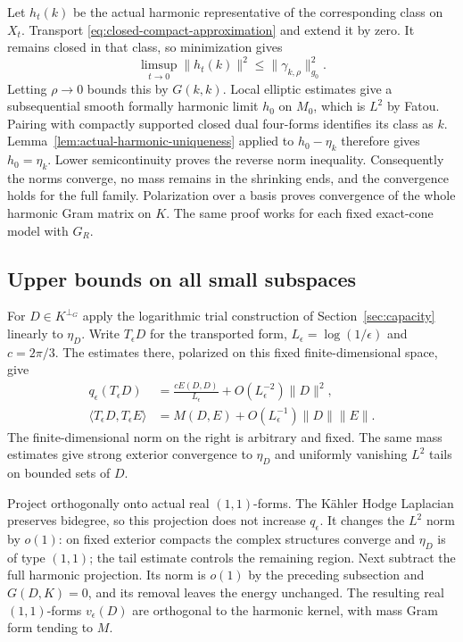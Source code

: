 Let $h_t(k)$ be the actual harmonic representative of the corresponding
class on $X_t$. Transport \eqref{eq:closed-compact-approximation} and
extend it by zero. It remains closed in that class, so minimization gives
\[
 \limsup_{t\to0}\|h_t(k)\|^2
 \le\|\gamma_{k,\rho}\|_{g_0}^2.
\]
Letting $\rho\to0$ bounds this by $G(k,k)$. Local elliptic estimates
give a subsequential smooth formally harmonic limit $h_0$ on $M_0$,
which is $L^2$ by Fatou. Pairing with compactly supported closed dual
four-forms identifies its class as $k$. Lemma~\ref{lem:actual-harmonic-uniqueness}
applied to $h_0-\eta_k$ therefore gives $h_0=\eta_k$.
Lower semicontinuity proves the reverse norm inequality.
Consequently the norms converge, no mass remains in the shrinking ends,
and the convergence holds for the full family. Polarization over a
basis proves convergence of the whole harmonic Gram matrix on $K$.
The same proof works for each fixed exact-cone model with $G_R$.

\subsection{Upper bounds on all small subspaces}
For $D\in K^{\perp_G}$ apply the logarithmic trial construction of
Section~\ref{sec:capacity} linearly to $\eta_D$. Write $T_\epsilon D$
for the transported form, $L_\epsilon=\log(1/\epsilon)$ and $c=2\pi/3$.
The estimates there, polarized on this fixed finite-dimensional space,
give
\begin{align}
 q_\epsilon(T_\epsilon D)
  &=\frac{cE(D,D)}{L_\epsilon}
          +O(L_\epsilon^{-2})\|D\|^2,\label{eq:matrix-trial-energy}\\
 \langle T_\epsilon D,T_\epsilon E\rangle
  &=M(D,E)+O(L_\epsilon^{-1})\|D\|\|E\|.\label{eq:matrix-trial-mass}
\end{align}
The finite-dimensional norm on the right is arbitrary and fixed.
The same mass estimates give strong exterior convergence to $\eta_D$
and uniformly vanishing $L^2$ tails on bounded sets of $D$.

Project orthogonally onto actual real $(1,1)$-forms. The K\"ahler
Hodge Laplacian preserves bidegree, so this projection does not increase
$q_\epsilon$. It changes the $L^2$ norm by $o(1)$: on fixed exterior
compacts the complex structures converge and $\eta_D$ is of type
$(1,1)$; the tail estimate controls the remaining region. Next subtract
the full harmonic projection. Its norm is $o(1)$ by the preceding
subsection and $G(D,K)=0$, and its removal leaves the energy unchanged.
The resulting real $(1,1)$-forms $v_\epsilon(D)$ are orthogonal to
the harmonic kernel, with mass Gram form tending to $M$.

